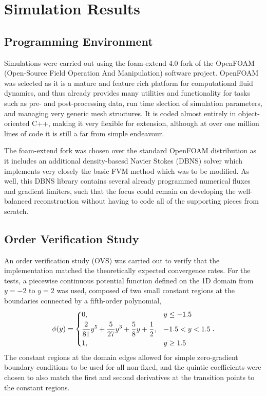 \chapter{Simulation Results}
\label{chap:results}

\section{Programming Environment}
\label{sec:environment}

Simulations were carried out using the foam-extend 4.0 fork of the OpenFOAM (Open-Source Field Operation And Manipulation) software project. OpenFOAM was selected as it is a mature and feature rich platform for computational fluid dynamics, and thus already provides many utilities and functionality for tasks such as pre- and post-processing data, run time slection of simulation parameters, and managing very generic mesh structures. It is coded almost entirely in object-oriented C++, making it very flexible for extension, although at over one million lines of code it is still a far from simple endeavour.

The foam-extend fork was chosen over the standard OpenFOAM distribution as it includes an additional density-basesd Navier Stokes (DBNS) solver which implements very closely the basic FVM method which was to be modified. As well, this DBNS library contains several already programmed numerical fluxes and gradient limiters, such that the focus could remain on developing the well-balanced reconstruction without having to code all of the supporting pieces from scratch.


\section{Order Verification Study}
\label{sec:OVS}

An order verification study (OVS) was carried out to verify that the implementation matched the theoretically expected convergence rates. For the tests, a piecewise continuous potential function defined on the 1D domain from $y=-2$ to $y=2$ was used, composed of two small constant regions at the boundaries connected by a fifth-order polynomial,
\begin{equation}
\phi(y)=
\begin{dcases} 
      0, & y\leq -1.5 \\
      \frac{2}{81}y^5+\frac{5}{27}y^3+\frac{5}{8}y+\frac{1}{2}, & -1.5<y<1.5 \\
      1, & y\geq 1.5
\end{dcases}.
\end{equation}
The constant regions at the domain edges allowed for simple zero-gradient boundary conditions to be used for all non-fixed, and the quintic coefficients were chosen to also match the first and second derivatives at the transition points to the constant regions.

